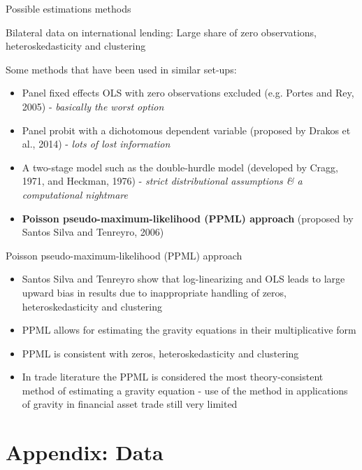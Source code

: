 \documentclass{beamer}
\begin{document}
\begin{frame}{Possible estimations methods}
\begin{block}{Bilateral data on international lending:}
Large share of zero observations, heteroskedasticity and clustering
\end{block}

\begin{block}{Some methods that have been used in similar set-ups:}
\begin{itemize}
\item Panel fixed effects OLS with zero observations excluded (e.g. Portes and Rey, 2005) - \textit{basically the worst option}
\item Panel probit with a dichotomous dependent variable (proposed by Drakos et al., 2014) - \textit{lots of lost information}
\item A two-stage model such as the double-hurdle model (developed by Cragg, 1971, and Heckman, 1976) - \textit{strict distributional assumptions \& a computational nightmare}
\item \textbf{Poisson pseudo-maximum-likelihood (PPML) approach} (proposed by Santos Silva and Tenreyro, 2006)
   \end{itemize}
\end{block}
\end{frame}

\begin{frame}{Poisson pseudo-maximum-likelihood (PPML) approach}
\begin{itemize}
\item Santos Silva and Tenreyro show that log-linearizing and OLS leads to large upward bias in results due to inappropriate handling of zeros, heteroskedasticity and clustering
\item PPML allows for estimating the gravity equations in their multiplicative form
\item PPML is consistent with zeros, heteroskedasticity and clustering
\item In trade literature the PPML is considered the most theory-consistent method of estimating a gravity equation - use of the method in applications of gravity in financial asset trade still very limited 
\end{itemize}
\end{frame}

\section{Appendix: Data}
\end{document}
